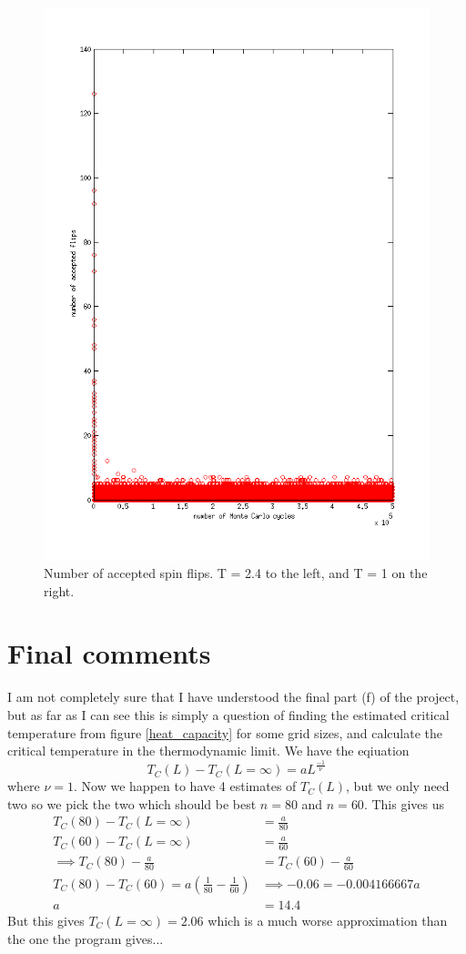 \documentclass[a4paper,english, 10pt, twoside]{article}
\begin{document}
\begin{figure}[H]
 \includegraphics[scale = 0.45]{accepted_flips_temp1.png}
 \caption{Number of accepted spin flips. T = 2.4 to the left, and T = 1 on the right.}
 \label{both_accepted_flpis}
\end{figure}
\section*{Final comments}
I am not completely sure that I have understood the final part (f) of the project, but as far as I can see this is simply a question 
of finding the estimated critical temperature from figure \ref{heat_capacity} for some grid sizes, and calculate the critical 
temperature in the thermodynamic limit. We have the eqiuation
$$
T_C(L) - T_C(L=\infty) = aL^{\frac{-1}{\nu}}
$$
where $\nu = 1$. Now we happen to have 4 estimates of $T_C(L)$, but we only need two so we pick the two which should be best 
$n = 80$ and $n = 60$. This gives us
\begin{align*}
 T_C(80) - T_C(L=\infty) &= \frac{a}{80} \\
  T_C(60) - T_C(L=\infty) &= \frac{a}{60} \\
  \implies T_C(80) - \frac{a}{80} &= T_C(60) - \frac{a}{60} \\
  T_C(80) - T_C(60) = a\left(\frac{1}{80} - \frac{1}{60}\right) &\implies -0.06 = -0.004166667a \\
  a &= 14.4
\end{align*}
But this gives $T_C(L=\infty) = 2.06$  which is a much worse approximation than the one the program gives...
\end{document}
